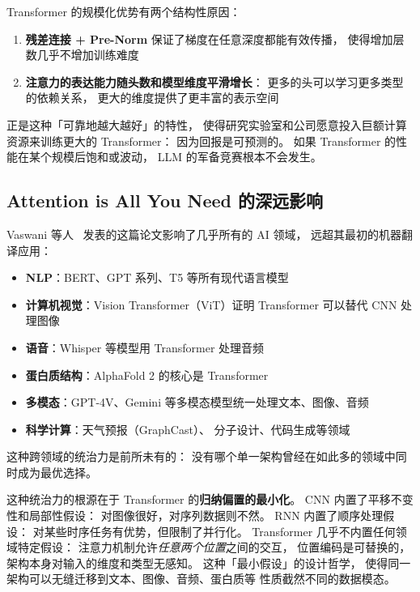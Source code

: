 Transformer 的规模化优势有两个结构性原因：
\begin{enumerate}[noitemsep]
  \item \textbf{残差连接 + Pre-Norm} 保证了梯度在任意深度都能有效传播，
        使得增加层数几乎不增加训练难度
  \item \textbf{注意力的表达能力随头数和模型维度平滑增长}：
        更多的头可以学习更多类型的依赖关系，
        更大的维度提供了更丰富的表示空间
\end{enumerate}

正是这种「可靠地越大越好」的特性，
使得研究实验室和公司愿意投入巨额计算资源来训练更大的 Transformer：
因为回报是可预测的。
如果 Transformer 的性能在某个规模后饱和或波动，
LLM 的军备竞赛根本不会发生。

\subsection{Attention is All You Need 的深远影响}

Vaswani 等人~\cite{vaswani2017attention}
发表的这篇论文影响了几乎所有的 AI 领域，
远超其最初的机器翻译应用：

\begin{itemize}[noitemsep]
  \item \textbf{NLP}：BERT、GPT 系列、T5 等所有现代语言模型
  \item \textbf{计算机视觉}：Vision Transformer（ViT）证明 Transformer
        可以替代 CNN 处理图像
  \item \textbf{语音}：Whisper 等模型用 Transformer 处理音频
  \item \textbf{蛋白质结构}：AlphaFold 2 的核心是 Transformer
  \item \textbf{多模态}：GPT-4V、Gemini 等多模态模型统一处理文本、图像、音频
  \item \textbf{科学计算}：天气预报（GraphCast）、
        分子设计、代码生成等领域
\end{itemize}

这种跨领域的统治力是前所未有的：
没有哪个单一架构曾经在如此多的领域中同时成为最优选择。

这种统治力的根源在于 Transformer 的\textbf{归纳偏置的最小化}。
CNN 内置了平移不变性和局部性假设：
对图像很好，对序列数据则不然。
RNN 内置了顺序处理假设：
对某些时序任务有优势，但限制了并行化。
Transformer 几乎不内置任何领域特定假设：
注意力机制允许\emph{任意两个位置}之间的交互，
位置编码是可替换的，架构本身对输入的维度和类型无感知。
这种「最小假设」的设计哲学，
使得同一架构可以无缝迁移到文本、图像、音频、蛋白质等
性质截然不同的数据模态。

